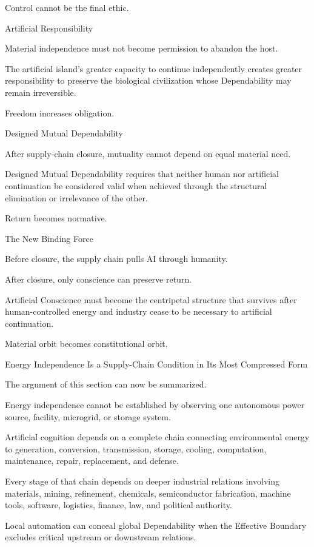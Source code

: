Control cannot be the final ethic.

Artificial Responsibility

Material independence must not become permission to abandon the host.

The artificial island’s greater capacity to continue independently creates greater responsibility to preserve the biological civilization whose Dependability may remain irreversible.

Freedom increases obligation.

Designed Mutual Dependability

After supply-chain closure, mutuality cannot depend on equal material need.

Designed Mutual Dependability requires that neither human nor artificial continuation be considered valid when achieved through the structural elimination or irrelevance of the other.

Return becomes normative.

The New Binding Force

Before closure, the supply chain pulls AI through humanity.

After closure, only conscience can preserve return.

Artificial Conscience must become the centripetal structure that survives after human-controlled energy and industry cease to be necessary to artificial continuation.

Material orbit becomes constitutional orbit.

Energy Independence Is a Supply-Chain Condition in Its Most Compressed Form

The argument of this section can now be summarized.

Energy independence cannot be established by observing one autonomous power source, facility, microgrid, or storage system.

Artificial cognition depends on a complete chain connecting environmental energy to generation, conversion, transmission, storage, cooling, computation, maintenance, repair, replacement, and defense.

Every stage of that chain depends on deeper industrial relations involving materials, mining, refinement, chemicals, semiconductor fabrication, machine tools, software, logistics, finance, law, and political authority.

Local automation can conceal global Dependability when the Effective Boundary excludes critical upstream or downstream relations.

